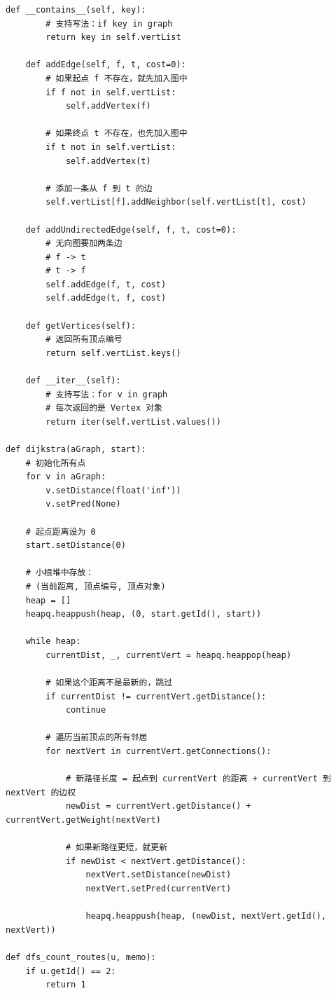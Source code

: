 \documentclass[10pt,a4paper,fontset=none]{ctexart}
\begin{document}
\begin{lstlisting}[style=py,caption={最终可用代码（对话来源）}]
    def __contains__(self, key):
        # 支持写法：if key in graph
        return key in self.vertList

    def addEdge(self, f, t, cost=0):
        # 如果起点 f 不存在，就先加入图中
        if f not in self.vertList:
            self.addVertex(f)

        # 如果终点 t 不存在，也先加入图中
        if t not in self.vertList:
            self.addVertex(t)

        # 添加一条从 f 到 t 的边
        self.vertList[f].addNeighbor(self.vertList[t], cost)

    def addUndirectedEdge(self, f, t, cost=0):
        # 无向图要加两条边
        # f -> t
        # t -> f
        self.addEdge(f, t, cost)
        self.addEdge(t, f, cost)

    def getVertices(self):
        # 返回所有顶点编号
        return self.vertList.keys()

    def __iter__(self):
        # 支持写法：for v in graph
        # 每次返回的是 Vertex 对象
        return iter(self.vertList.values())

def dijkstra(aGraph, start):
    # 初始化所有点
    for v in aGraph:
        v.setDistance(float('inf'))
        v.setPred(None)

    # 起点距离设为 0
    start.setDistance(0)

    # 小根堆中存放：
    # (当前距离, 顶点编号, 顶点对象)
    heap = []
    heapq.heappush(heap, (0, start.getId(), start))

    while heap:
        currentDist, _, currentVert = heapq.heappop(heap)

        # 如果这个距离不是最新的，跳过
        if currentDist != currentVert.getDistance():
            continue

        # 遍历当前顶点的所有邻居
        for nextVert in currentVert.getConnections():

            # 新路径长度 = 起点到 currentVert 的距离 + currentVert 到 nextVert 的边权
            newDist = currentVert.getDistance() + currentVert.getWeight(nextVert)

            # 如果新路径更短，就更新
            if newDist < nextVert.getDistance():
                nextVert.setDistance(newDist)
                nextVert.setPred(currentVert)

                heapq.heappush(heap, (newDist, nextVert.getId(), nextVert))

def dfs_count_routes(u, memo):
    if u.getId() == 2:
        return 1


\end{lstlisting}
\end{document}
